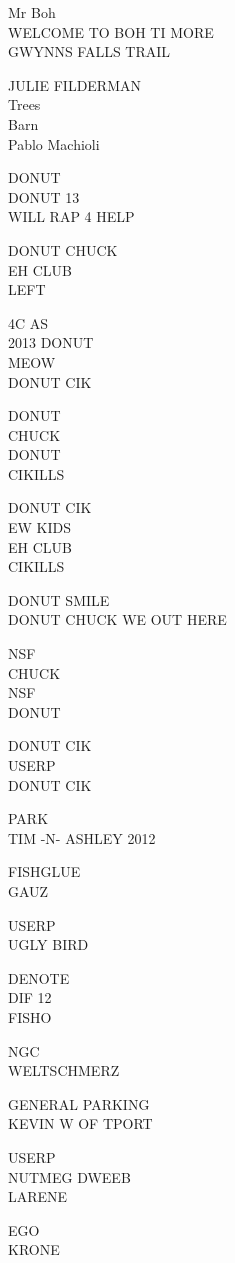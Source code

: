 \documentclass[10pt,letterpaper]{article}
\begin{document}
Mr Boh\\
WELCOME TO BOH TI MORE\\
GWYNNS FALLS TRAIL

JULIE FILDERMAN\\
Trees\\
Barn\\
Pablo Machioli

DONUT\\
DONUT 13\\
WILL RAP 4 HELP

DONUT CHUCK\\
EH CLUB\\
LEFT

4C AS\\
2013 DONUT\\
MEOW\\
DONUT CIK

DONUT\\
CHUCK\\
DONUT\\
CIKILLS

DONUT CIK\\
EW KIDS\\
EH CLUB\\
CIKILLS

DONUT SMILE\\
DONUT CHUCK WE OUT HERE

NSF\\
CHUCK\\
NSF\\
DONUT

DONUT CIK\\
USERP\\
DONUT CIK

PARK\\
TIM {-}N{-} ASHLEY 2012

FISHGLUE\\
GAUZ

USERP\\
UGLY BIRD

DENOTE\\
DIF 12\\
FISHO

NGC\\
WELTSCHMERZ

GENERAL PARKING\\
KEVIN W OF TPORT

USERP\\
NUTMEG DWEEB\\
LARENE

EGO\\
KRONE
\end{document}
